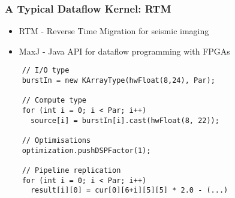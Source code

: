 \begin{frame}[fragile]
  \frametitle{A Typical Dataflow Kernel: RTM}
  \begin{itemize}
  \item RTM - Reverse Time Migration for seismic imaging
  \item MaxJ - Java API for dataflow programming with FPGAs
  \end{itemize}

  \begin{lstlisting}
    // I/O type
    burstIn = new KArrayType(hwFloat(8,24), Par);

    // Compute type
    for (int i = 0; i < Par; i++)
      source[i] = burstIn[i].cast(hwFloat(8, 22));

    // Optimisations
    optimization.pushDSPFactor(1);

    // Pipeline replication
    for (int i = 0; i < Par; i++)
      result[i][0] = cur[0][6+i][5][5] * 2.0 - (...)
  \end{lstlisting}
\end{frame}